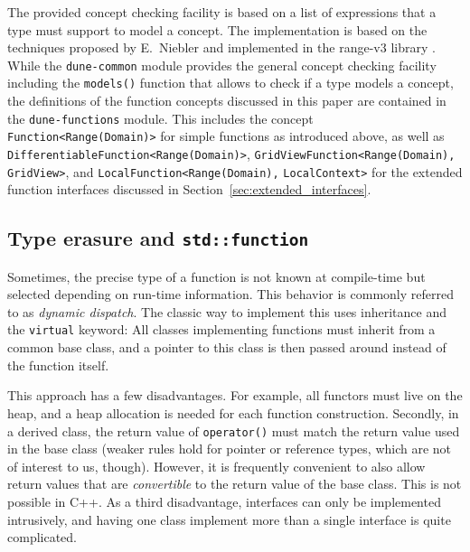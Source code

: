 \documentclass[11pt,
                 numbers=noenddot,
                 headings=normal,
                 DIV16, BCOR10mm]{scrartcl}
\newcommand{\cpp}{\lstinline}
\theoremstyle{remark}
\newcommand{\dunemodule}[1]{\texttt{#1}}
\begin{document}
The provided concept checking facility is based on a list of
expressions that a type must support to model a concept.
The implementation is based on the techniques proposed
by E.~Niebler \cite{Niebler:concepts} and implemented
in the range-v3 library \cite{Niebler:rangev3}.
While the \dunemodule{dune-common} module provides
the general concept checking facility including the
\cpp{models()} function that allows to check if a type
models a concept,
the definitions of the function concepts discussed in this
paper are contained in the \dunemodule{dune-functions} module.
This includes the concept \cpp{Function<Range(Domain)>} for simple
functions as introduced above, as well as
\cpp{DifferentiableFunction<Range(Domain)>},
\cpp{GridViewFunction<Range(Domain), GridView>},
and \cpp{LocalFunction<Range(Domain),} \linebreak \cpp{LocalContext>}
for the extended function interfaces discussed in
Section~\ref{sec:extended_interfaces}.



\subsection{Type erasure and \texorpdfstring{\cpp{std::function}}{std::function}}

Sometimes, the precise type of a function is not known at compile-time but
selected depending on run-time information. This behavior is commonly referred
to as \emph{dynamic dispatch}.  The classic way to implement this uses
inheritance and the \cpp{virtual} keyword: All classes implementing functions  must inherit from a common base class,
and a pointer to this class is then passed around instead of the function itself.

This approach has a few disadvantages.  For example, all functors must live on the heap, and a heap
allocation is needed for each function construction.  Secondly, in a derived class, the return value of
\cpp{operator()} must match the return value used in the base class (weaker rules hold for pointer or reference types,
which are not of interest to us, though).  However, it is
frequently convenient to also allow return values that are {\em convertible} to the return value of the
base class.  This is not possible in C++. As a third disadvantage,
interfaces can only be implemented intrusively, and having one class implement
more than a single interface is quite complicated.
\end{document}
